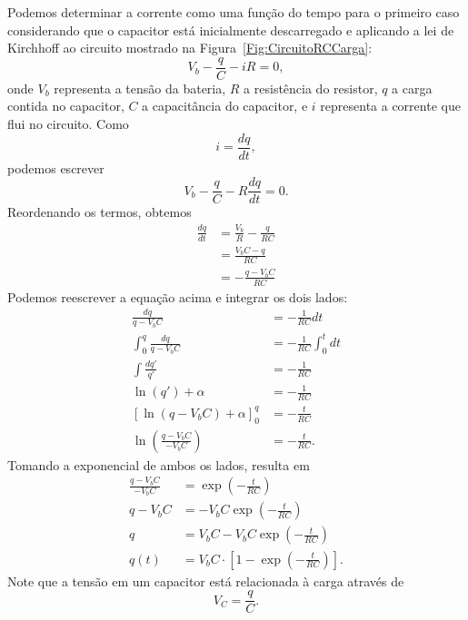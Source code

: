 Podemos determinar a corrente como uma função do tempo para o primeiro caso considerando que o capacitor está inicialmente descarregado e aplicando a lei de Kirchhoff ao circuito mostrado na Figura~\ref{Fig:CircuitoRCCarga}:
\begin{equation}
	V_b - \frac{q}{C} - iR = 0,
\end{equation}
%
onde $V_b$ representa a tensão da bateria, $R$ a resistência do resistor, $q$ a carga contida no capacitor, $C$ a capacitância do capacitor, e $i$ representa a corrente que flui no circuito.
%
Como
\begin{equation}
	i = \frac{dq}{dt},
\end{equation}
%
podemos escrever
\begin{equation}
	V_b - \frac{q}{C} - R\frac{dq}{dt} = 0.
\end{equation}
%
Reordenando os termos, obtemos
\begin{align}
	\frac{dq}{dt} &= \frac{V_b}{R} - \frac{q}{RC}\\
	&= \frac{V_bC - q}{RC} \\
	&= - \frac{q - V_bC}{RC}
\end{align}
%
Podemos reescrever a equação acima e integrar os dois lados:
\begin{align}
	\frac{dq}{q - V_bC} &= -\frac{1}{RC} dt \\
	\int_0^q \frac{dq}{q - V_bC} &= -\frac{1}{RC} \int_0^t dt \\
	\int \frac{dq'}{q'} &= -\frac{1}{RC} \\
	\ln(q') + \alpha &= -\frac{1}{RC} \\
	\left[\ln(q - V_bC) + \alpha\right]_0^q &= -\frac{t}{RC} \\
	\ln\left(\frac{q - V_bC}{-V_bC}\right) &= -\frac{t}{RC}.
\end{align}
%
Tomando a exponencial de ambos os lados, resulta em
\begin{align}
	\frac{q-V_bC}{-V_bC} &= \exp\left(-\frac{t}{RC}\right) \\
	q - V_bC &= -V_bC \exp\left(-\frac{t}{RC}\right) \\
	q &= V_bC - V_bC \exp\left(-\frac{t}{RC}\right) \\
	q(t) &= V_bC \cdot \left[1 - \exp\left(-\frac{t}{RC}\right)\right].
\end{align}
%
Note que a tensão em um capacitor está relacionada à carga através de
\begin{equation}
    V_C = \frac{q}{C}.
\end{equation}

